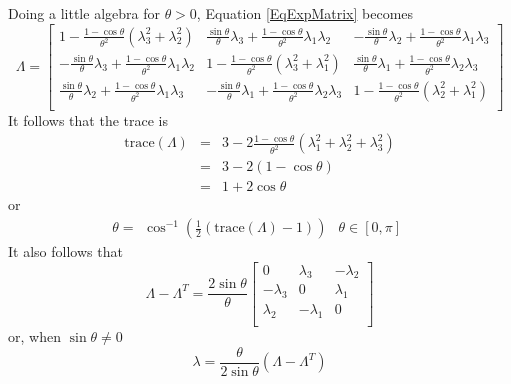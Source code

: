 \documentclass[10pt,letterpaper,oneside,notitlepage]{article}
\begin{document}
Doing a little algebra for $\theta > 0$, Equation \ref{EqExpMatrix} becomes
\begin{equation}
\label{EqMatrixAlgebra}
\Lambda =
 \begin{bmatrix}
  1-\frac{1-\cos\theta}{\theta^2}\left( \lambda_3^2 + \lambda_2^2\right) 
&   \frac{\sin\theta}{\theta}\lambda_3+\frac{1-\cos\theta}{\theta^2}\lambda_1\lambda_2  
&  -\frac{\sin\theta}{\theta}\lambda_2+\frac{1-\cos\theta}{\theta^2}\lambda_1\lambda_3 \\
   -\frac{\sin\theta}{\theta}\lambda_3+\frac{1-\cos\theta}{\theta^2}\lambda_1\lambda_2
&  1-\frac{1-\cos\theta}{\theta^2}\left( \lambda_3^2 + \lambda_1^2\right) 
&  \frac{\sin\theta}{\theta}\lambda_1+\frac{1-\cos\theta}{\theta^2}\lambda_2\lambda_3  \\
   \frac{\sin\theta}{\theta}\lambda_2+\frac{1-\cos\theta}{\theta^2}\lambda_1\lambda_3 
& -\frac{\sin\theta}{\theta}\lambda_1+\frac{1-\cos\theta}{\theta^2}\lambda_2\lambda_3 
&  1-\frac{1-\cos\theta}{\theta^2}\left( \lambda_2^2 + \lambda_1^2\right)                    \\
 \end{bmatrix}
\end{equation}
It follows that the trace is 
\begin{eqnarray*}
\mathrm{trace}(\Lambda) &=& 3 - 2\frac{1-\cos\theta}{\theta^2}(\lambda_1^2 + \lambda_2^2 + \lambda_3^2) \\
               &=& 3 - 2\left(1-\cos\theta\right) \\
               &=& 1 + 2\cos\theta
\end{eqnarray*} or
\begin{equation}
\theta= \begin{matrix} \cos^{-1}\left(\frac{1}{2}\left(\mathrm{trace}(\Lambda)-1\right)\right) & \theta \in \left[0,\pi\right]\end{matrix}
\end{equation}
It also follows that  
\begin{equation}
\Lambda - \Lambda^T=\frac{2\sin\theta}{\theta}
 \begin{bmatrix}
  0  &   \lambda_3  &  -\lambda_2 \\
   -\lambda_3 &  0 &  \lambda_1  \\
   \lambda_2 & -\lambda_1 &  0 \\
 \end{bmatrix}
\end{equation} or, when $\sin\theta \neq 0$
\begin{equation}
\label{EqLambdaSinNot0}
\lambda = \frac{\theta}{2\sin\theta} \left( \Lambda - \Lambda^T\right)
\end{equation}
\end{document}
